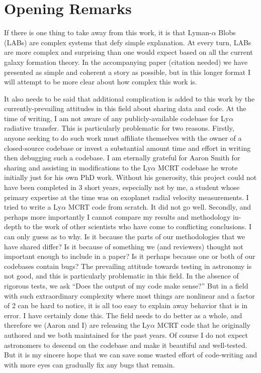 \section{Opening Remarks}
If there is one thing to take away from this work, it is that Lyman-$\alpha$ Blobs (LABs) are complex systems that defy simple explanation.
At every turn, LABs are more complex and surprising than one would expect based on all the current galaxy formation theory.
In the accompanying paper (citation needed) we have presented as simple and coherent a story as possible, but in this longer format I will attempt to be more clear about how complex this work is.

It also needs to be said that additional complication is added to this work by the currently-prevailing attitudes in this field about sharing data and code.
At the time of writing, I am not aware of any publicly-available codebase for Ly$\alpha$ radiative transfer.
This is particularly problematic for two reasons.
Firstly, anyone seeking to do such work must affiliate themselves with the owner of a closed-source codebase or invest a substantial amount time and effort in writing then debugging such a codebase.
I am eternally grateful for Aaron Smith for sharing and assisting in modifications to the Ly$\alpha$ MCRT codebase he wrote initially just for his own PhD work.
Without his generosity, this project could not have been completed in 3 short years, especially not by me, a student whose primary expertise at the time was on exoplanet radial velocity measurements.
I tried to write a Ly$\alpha$ MCRT code from scratch.
It did not go well.
Secondly, and perhaps more importantly I cannot compare my results and methodology in-depth to the work of other scientists who have come to conflicting conclusions.
I can only guess as to why.
Is it because the parts of our methodologies that we have shared differ?
Is it because of something we (and reviewers) thought not important enough to include in a paper?
Is it perhaps because one or both of our codebases contain bugs?
The prevailing attitude towards testing in astronomy is not good, and this is particularly problematic in this field.
In the absence of rigorous tests, we ask ``Does the output of my code make sense?''
But in a field with such extraordinary complexity where most things are nonlinear and a factor of 2 can be hard to notice, it is all too easy to explain away behavior that is in error.
I have certainly done this.
The field needs to do better as a whole, and therefore we (Aaron and I) are releasing the Ly$\alpha$ MCRT code that he originally authored and we both maintained for the past years.
Of course I do not expect astronomers to descend on the codebase and make it beautiful and well-tested.
But it is my sincere hope that we can save some wasted effort of code-writing and with more eyes can gradually fix any bugs that remain.

